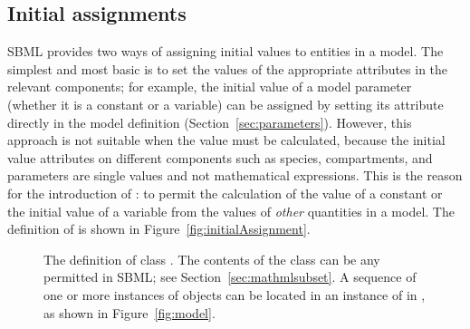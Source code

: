 \subsection{Initial assignments}
\label{sec:initialAssignment}

SBML \thisLV provides two ways of assigning initial values to
entities in a model.  The simplest and most basic is to set the
values of the appropriate attributes in the relevant
components; for example, the initial value of a model parameter
(whether it is a constant or a variable) can be assigned by
setting its  attribute directly in the model definition
(Section~\ref{sec:parameters}).  However, this approach is not
suitable when the value must be calculated, because the initial
value attributes on different components such as species,
compartments, and parameters are single values and not
mathematical expressions.  This is the reason for the introduction
of \InitialAssignment: to permit the calculation of the value of a
constant or the initial value of a variable from the values of
\emph{other} quantities in a model.  The definition of
\InitialAssignment is shown in Figure~\vref{fig:initialAssignment}.

\begin{figure}[htb]
  \centering
  \small
  \caption{The definition of class \InitialAssignment.  The
    contents of the  class can be any \mathml
    permitted in SBML; see
    Section~\protect\ref{sec:mathmlsubset}.  A
    sequence of one or more instances of \InitialAssignment
    objects can be located in an instance of
    \ListOfInitialAssignments in \Model, as shown in
    Figure~\protect\ref{fig:model}.}
  \label{fig:initialAssignment}
\end{figure}

